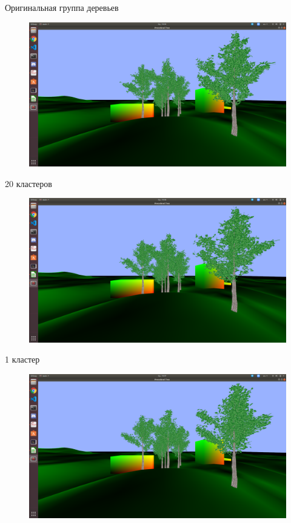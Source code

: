 \documentclass[14pt]{beamer}
\begin{document}
\begin{frame}{Оригинальная группа деревьев}
\begin{figure}[hbtp]
\includegraphics[scale=0.165]{92_clusters.png}
\end{figure}
\end{frame}
\begin{frame}{20 кластеров}
\begin{figure}[hbtp]
\includegraphics[scale=0.165]{20_clusters.png}
\end{figure}
\end{frame}
\begin{frame}{1 кластер}
\begin{figure}[hbtp]
\includegraphics[scale=0.165]{1_cluster.png}
\end{figure}
\end{frame}
\end{document}
